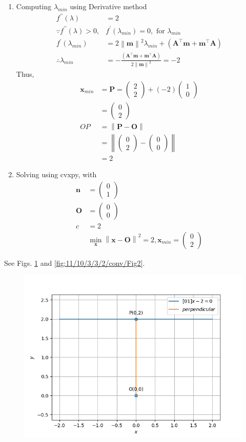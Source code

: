 \documentclass[12pt]{article}
\providecommand{\brak}[1]{\ensuremath{\left(#1\right)}}
\providecommand{\norm}[1]{\left\lVert#1\right\rVert}
\newcommand{\myvec}[1]{\ensuremath{\begin{pmatrix}#1\end{pmatrix}}}
\let\vec\mathbf
\begin{document}
\begin{enumerate}
\item Computing $\lambda_{min}$ using Derivative method
\begin{align}
	f^{\prime\prime}\brak{\lambda} &= 2\\
	\because f^{\prime\prime}\brak{\lambda}>0,&f^{\prime}\brak{\lambda_{min}}=0, \text{ for } \lambda_{min}\\
	f^{\prime}\brak{\lambda_{min}} &= 2\norm{\vec{m}}^2\lambda_{min}+\brak{\vec{A}^\top\vec{m}+\vec{m}^\top\vec{A}}\\
	\therefore \lambda_{min} &= -\frac{\brak{\vec{A}^\top\vec{m}+\vec{m}^\top\vec{A}}}{2\norm{\vec{m}}^2} = -2
\end{align}
Thus, 
\begin{align}
	\vec{x}_{min} &= \vec{P} = \myvec{2\\2}+\brak{-2}\myvec{1\\0}\\
	&= \myvec{0\\2}\\
	OP &= \norm{\vec{P}-\vec{O}}\\
	&= \norm{\myvec{0\\2}-\myvec{0\\0}}\\
	&= 2
\end{align}
\item Solving using cvxpy, with
\begin{align}
	\vec{n} &= \myvec{0\\1}\\
	\vec{O} &= \myvec{0\\0}\\
	c &= 2\\
	&\min_{\vec{x}}\norm{\vec{x}-\vec{O}}^2 = 2, \vec{x}_{min} = \myvec{0\\2}
\end{align}
\end{enumerate}
See Figs. \ref{fig:11/10/3/3/2/conv/Fig1} and \ref{fig:11/10/3/3/2/conv/Fig2}.
\begin{figure}[!h]
	\begin{center} 
	    \includegraphics[width=\columnwidth]{11/10/3/3/2/conv/figs/opt1}
	\end{center}
\caption{}
\label{fig:11/10/3/3/2/conv/Fig1}
\end{figure}
\end{document}
